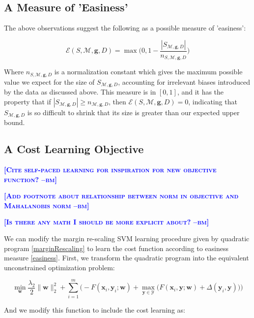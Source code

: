 \documentclass{article} %
\newcommand{\bmcomment}[1]{\textcolor{blue}{\textsc{\textbf{[#1 --bm]}}}}
\begin{document}
\subsection{A Measure of 'Easiness'}

The above observations suggest the following as a possible 
measure of 'easiness':

\begin{equation}
\label{easiness}
\mathcal{E}(S,\mathcal{M},\mathbf{g},D)=\max\bigg(0, 1-\frac{|S_{\mathcal{M},\mathbf{g},D}|}{n_{S,\mathcal{M},\mathbf{g},D}}\bigg)
\end{equation}

Where $n_{S,\mathcal{M},\mathbf{g},D}$ is a normalization constant which
gives the maximum possible value we expect for the size of 
$S_{\mathcal{M},\mathbf{g},D}$, accounting for irrelevant biases
introduced by the data as discussed above.  This measure is in
$[0,1]$, and it has the property that if 
$|S_{\mathcal{M},\mathbf{g},D}|\geq n_{\mathcal{M},\mathbf{g},D}$,
then $\mathcal{E}(S,\mathcal{M},\mathbf{g},D)=0$, indicating that
$S_{\mathcal{M},\mathbf{g},D}$ is so difficult to shrink that its
size is greater than our expected upper bound.

\subsection{A Cost Learning Objective}

\bmcomment{Cite self-paced learning for inspiration for new objective function?}

\bmcomment{Add footnote about relationship between norm in objective and
Mahalanobis norm}

\bmcomment{Is there any math I should be more explicit about?}

We can modify the margin re-scaling SVM learning procedure given by 
quadratic program \ref{marginRescaling} to learn the cost function 
according to easiness measure \ref{easiness}.
First, we transform the quadratic program
into the equivalent unconstrained optimization problem:

\begin{equation}
\label{svmObjective}
\min_{\mathbf{w}} \frac{\lambda_2}{2}\|\mathbf{w}\|_2^2 + \sum_{i=1}^m\bigg(-F(\mathbf{x}_i,\mathbf{y}_i;\mathbf{w})+\max_{\mathbf{y}\in \mathcal{Y}}\Big(F(\mathbf{x}_i,\mathbf{y};\mathbf{w})+\Delta(\mathbf{y}_i,\mathbf{y})\Big)\bigg)
\end{equation}

And we modify this function to include the cost learning as:
\end{document}
